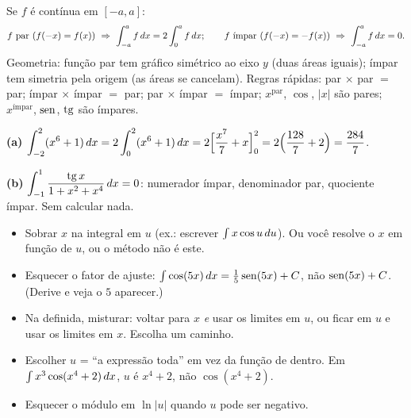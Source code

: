 \begin{definicao}
Se $f$ é contínua em $[-a,a]$:
\[
f\ \text{par}\ (f(-x)=f(x))\ \Rightarrow\ \int_{-a}^{a}f\dx=2\int_0^a f\dx;
\qquad
f\ \text{ímpar}\ (f(-x)=-f(x))\ \Rightarrow\ \int_{-a}^{a}f\dx=0 .
\]
Geometria: função par tem gráfico simétrico ao eixo $y$ (duas áreas iguais); ímpar tem simetria pela origem (as áreas se cancelam). Regras rápidas: par $\times$ par $=$ par; ímpar $\times$ ímpar $=$ par; par $\times$ ímpar $=$ ímpar; $x^{\text{par}}$, $\cos$, $|x|$ são pares; $x^{\text{ímpar}}$, $\operatorname{sen}$, $\operatorname{tg}$ são ímpares.
\end{definicao}

\begin{exemplo}
\textbf{(a)} $\displaystyle\int_{-2}^{2}(x^6+1)\,dx=2\int_0^2(x^6+1)\,dx=2\Big[\frac{x^7}{7}+x\Big]_0^2=2\Big(\frac{128}{7}+2\Big)=\frac{284}{7}$.

\textbf{(b)} $\displaystyle\int_{-1}^{1}\frac{\operatorname{tg} x}{1+x^2+x^4}\,dx=0$: numerador ímpar, denominador par, quociente ímpar. Sem calcular nada.
\end{exemplo}

\begin{armadilha}
\begin{itemize}[leftmargin=1.4em, itemsep=1pt]
\item Sobrar $x$ na integral em $u$ (ex.: escrever $\int x\cos u\,du$). Ou você resolve o $x$ em função de $u$, ou o método não é este.
\item Esquecer o fator de ajuste: $\int\cos(5x)\,dx=\frac15\operatorname{sen}(5x)+C$, não $\operatorname{sen}(5x)+C$. (Derive e veja o $5$ aparecer.)
\item Na definida, misturar: voltar para $x$ \emph{e} usar os limites em $u$, ou ficar em $u$ e usar os limites em $x$. Escolha um caminho.
\item Escolher $u$ = ``a expressão toda'' em vez da função de dentro. Em $\int x^3\cos(x^4+2)\,dx$, $u$ é $x^4+2$, não $\cos(x^4+2)$.
\item Esquecer o módulo em $\ln|u|$ quando $u$ pode ser negativo.
\end{itemize}
\end{armadilha}

